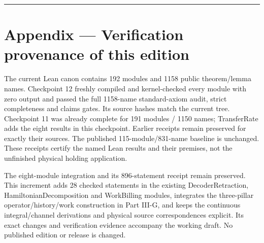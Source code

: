 \documentclass[
]{article}
\begin{document}
\begin{center}\rule{0.5\linewidth}{0.5pt}\end{center}

\section{Appendix --- Verification provenance of this
edition}\label{appendix-verification-provenance-of-this-edition}

The current Lean canon contains 192 modules and 1158 public
theorem/lemma names. Checkpoint 12 freshly compiled and kernel-checked
every module with zero output and passed the full 1158-name
standard-axiom audit, strict completeness and claims gates. Its source
hashes match the current tree. Checkpoint 11 was already complete for
191 modules / 1150 names; TransferRate adds the eight results in this
checkpoint. Earlier receipts remain preserved for exactly their sources.
The published
1\allowbreak{}1\allowbreak{}5\allowbreak{}-\allowbreak{}m\allowbreak{}o\allowbreak{}d\allowbreak{}u\allowbreak{}l\allowbreak{}e\allowbreak{}/\allowbreak{}8\allowbreak{}3\allowbreak{}1\allowbreak{}-\allowbreak{}n\allowbreak{}a\allowbreak{}m\allowbreak{}e
baseline is unchanged. These receipts certify the named Lean results and
their premises, not the unfinished physical holding application.

The eight-module integration and its 896-statement receipt remain
preserved. This increment adds 28 checked statements in the existing
DecoderRetraction, HamiltonianDecomposition and WorkBilling modules,
integrates the three-pillar
o\allowbreak{}p\allowbreak{}e\allowbreak{}r\allowbreak{}a\allowbreak{}t\allowbreak{}o\allowbreak{}r\allowbreak{}/\allowbreak{}h\allowbreak{}i\allowbreak{}s\allowbreak{}t\allowbreak{}o\allowbreak{}r\allowbreak{}y\allowbreak{}/\allowbreak{}w\allowbreak{}o\allowbreak{}r\allowbreak{}k
construction in Part III-G, and keeps the continuous
i\allowbreak{}n\allowbreak{}t\allowbreak{}e\allowbreak{}g\allowbreak{}r\allowbreak{}a\allowbreak{}l\allowbreak{}/\allowbreak{}c\allowbreak{}h\allowbreak{}a\allowbreak{}n\allowbreak{}n\allowbreak{}e\allowbreak{}l
derivations and physical source correspondences explicit. Its exact
changes and verification evidence accompany the working draft. No
published edition or release is changed.
\end{document}
